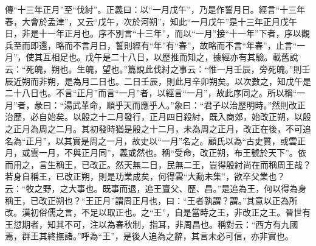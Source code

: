 {\noindent\zhuan{}\fzbyks 傳“十三年正月”至“伐紂”。正義曰：以“一月戊午”，乃是作誓月日。經言“十三年春，大會於孟津”，又云“戊午，次於河朔”，知此“一月戊午”是十三年正月戊午日，非是十一年正月也。序不別言“十三年”，而以“一月”接“十一年”下者，序以觀兵至而即還，略而不言月日，誓則經有“年”有“春”，故略而不言“年春”，止言“一月”，使其互相足也。戊午是二十八日，以歷推而知之，據經亦有其驗。載舊說云：“死魄，朔也。生魄，望也。”篇說此伐紂之事云：“惟一月壬辰，旁死魄。”則壬辰近朔而非朔，是為月二日也。二日壬辰，則此月辛卯朔矣。以次數之，知戊午是二十八日也。不言“正月”而言“一月”者，以經言“一月”，故此序同之。所以稱“一月”者，彖曰：“湯武革命，順乎天而應乎人。”象曰：“君子以治歷明時。”然則改正治歷，必自始矣。以殷之十二月發行，正月四日殺紂，既入商郊，始改正朔，以殷之正月為周之二月。其初發時猶是殷之十二月，未為周之正月，改正在後，不可追名為“正月”，以其實是周之一月，故史以“一月”名之。顧氏以為“古史質，或雲正月，或雲一月，不與正月同”，義或然也。稱“受命，改正朔，布王號於天下”。依而用之，言生稱王，已改正。然天無二日，民無二王，豈得殷紂尚在而稱周王哉？若身自稱王，已改正朔，則是功業成矣，何得雲“大勳未集”，欲卒父業也？云：“牧之野，之大事也。既事而退，追王亶父、歷、昌。”是追為王，何以得為身稱王，已改正朔也？“王正月”謂周正月也，曰：“王者孰謂？謂。”其意以正為所改。漢初俗儒之言，不足以取正也。之“王”，自是當時之王，非改正之王。晉世有王愆期者，知其不可，注以為春秋制，指耳，非周昌也。稱對云：“西方有九國焉，群王其終撫諸。”呼為“王”，是後人追為之辭，其言未必可信，亦非實也。 \par}

